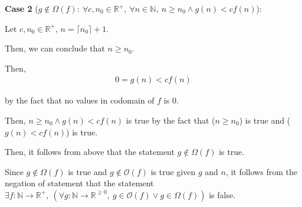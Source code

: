 \documentclass[12pt]{article}
\begin{document}
\begin{enumerate}[a.]
    \bigskip

    \textbf{Case 2} ($g \notin \Omega (f):\:\forall c,n_0 \in \mathbb{R}^{+},\:
    \forall n \in \mathbb{N},\:n \geq n_0 \land g(n) < cf(n)$):

    \bigskip

    Let $c,n_0 \in \mathbb{R}^{+}$, $n = \lceil n_0 \rceil + 1$.

    \bigskip

    Then, we can conclude that $n \geq n_0$.

    \bigskip

    Then,
    \setcounter{equation}{0}
    \begin{align}
        0 = g(n) < cf(n)
    \end{align}

    by the fact that no values in codomain of $f$ is 0.

    \bigskip

    Then, $n \geq n_0 \land g(n) < cf(n)$ is true by the fact that
    ($n \geq n_0$) is true and ($g(n) < cf(n)$) is true.

    \bigskip

    Then, it follows from above that the statement $g \notin \Omega(f)$ is true.

    \bigskip

    Since $g \notin \Omega(f)$  is true and $g \notin \mathcal{O}(f)$ is true given
    $g$ and $n$, it follows from the negation of statement that the statement $\exists
    f: \mathbb{N} \to \mathbb{R}^{+},\:(\forall g: \mathbb{N} \to \mathbb{R}^{\geq 0},\:
    g \in \mathcal{O}(f) \lor g \in \Omega(f))$ is false.

\end{enumerate}
\end{document}
